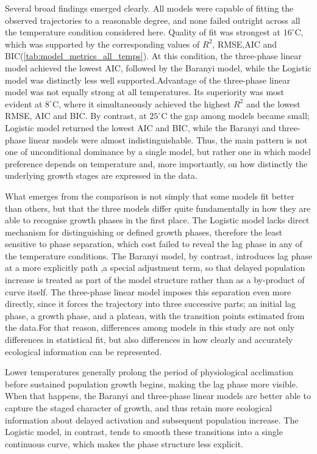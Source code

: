 \documentclass[11pt,onecolumn,draftclsnofoot]{IEEEtran}
\begin{document}
Several broad findings emerged clearly. All models were capable of fitting the observed trajectories to a reasonable degree, and none failed outright across all the temperature condition considered here. Quality of fit was strongest at $16^\circ\mathrm{C}$, which was supported by the corresponding values of $R^2$, RMSE,AIC and BIC(\ref{tab:model_metrics_all_temps}). At this condition, the three-phase linear model achieved the lowest AIC, followed by the Baranyi model, while the Logistic model was distinctly less well supported.Advantage of the three-phase linear model was not equally strong at all temperatures. Its superiority was most evident at $8^\circ\mathrm{C}$, where it simultaneously achieved the highest $R^2$ and the lowest RMSE, AIC and BIC. By contrast, at $25^\circ\mathrm{C}$ the gap among models became small; Logistic model returned the lowest AIC and BIC, while the Baranyi and three-phase linear models were almost indistinguishable. Thus, the main pattern is not one of unconditional dominance by a single model, but rather one in which model preference depends on temperature and, more importantly, on how distinctly the underlying growth stages are expressed in the data.

What emerges from the comparison is not simply that some models fit better than others, but that the three models differ quite fundamentally in how they are able to recognise growth phases in the first place. The Logistic model lacks direct mechanism for distinguishing or defined growth phases, therefore the least sensitive to phase separation, which cost failed to reveal the lag phase in any of the temperature conditions. The Baranyi model, by contrast, introduces lag phase at a more explicitly path ,a special  adjustment term, so that delayed population increase is treated as part of the model structure rather than as a by-product of curve itself. The three-phase linear model imposes this separation even more directly, since it forces the trajectory into three successive parts; an initial lag phase, a growth phase, and a plateau, with the transition points estimated from the data.For that reason, differences among models in this study are not only differences in statistical fit, but also differences in how clearly and accurately ecological information can be represented.

Lower temperatures generally prolong the period of physiological acclimation before sustained population growth begins, making the lag phase more visible. When that happens, the Baranyi and three-phase linear models are better able to capture the staged character of growth, and thus retain more ecological information about delayed activation and subsequent population increase. The Logistic model, in contrast, tends to smooth these transitions into a single continuous curve, which makes the phase structure less explicit\cite{NICOLA2019107563}.
\end{document}
